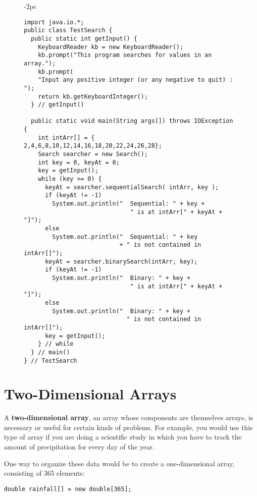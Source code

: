 \begin{figure}[thb]
\jjjprogstart
\begin{jjjlistingleft}[28pc]{-2pc}
\begin{lstlisting}
import java.io.*;
public class TestSearch {
  public static int getInput() {
    KeyboardReader kb = new KeyboardReader();
    kb.prompt("This program searches for values in an array.");
    kb.prompt(
    "Input any positive integer (or any negative to quit) : ");
    return kb.getKeyboardInteger();
  } // getInput()

  public static void main(String args[]) throws IOException {
    int intArr[] = { 2,4,6,8,10,12,14,16,18,20,22,24,26,28};
    Search searcher = new Search();
    int key = 0, keyAt = 0;
    key = getInput();
    while (key >= 0) {
      keyAt = searcher.sequentialSearch( intArr, key );
      if (keyAt != -1)
        System.out.println("  Sequential: " + key + 
                              " is at intArr[" + keyAt + "]");
      else
        System.out.println("  Sequential: " + key 
                           + " is not contained in intArr[]");
      keyAt = searcher.binarySearch(intArr, key);
      if (keyAt != -1)
        System.out.println("  Binary: " + key + 
                              " is at intArr[" + keyAt + "]");
      else
        System.out.println("  Binary: " + key + 
                             " is not contained in intArr[]");
      key = getInput();
    } // while
  } // main()
} // TestSearch
\end{lstlisting}
\end{jjjlistingleft}
\end{figure}


\section{Two-Dimensional Arrays}
\noindent A {\bf two-dimensional array}, an array whose components are
themselves arrays, is necessary or useful for certain kinds of
problems.  For example, you would use this type of array if you are
doing a scientific study in which you have to track the amount of
precipitation for every day of the year.

One way to organize these data would be to create a one-dimensional
array, consisting of 365 elements:

\begin{jjjlisting}
\begin{lstlisting}
double rainfall[] = new double[365];
\end{lstlisting}
\end{jjjlisting}

